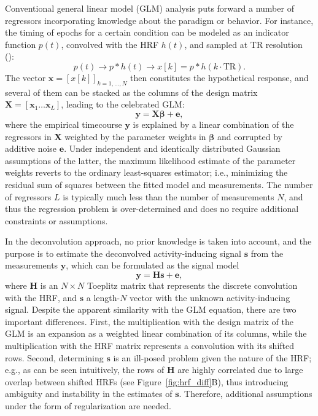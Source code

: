 Conventional general linear model (GLM) analysis puts forward a number of regressors incorporating knowledge about the paradigm or behavior. For instance, the timing of epochs for a certain condition can be modeled as an indicator function $p(t)$, convolved with the HRF $h(t)$, and sampled at TR resolution (\citealt{friston1994analysis, friston1998event, boynton1996linear, cohen1997parametric}):
$$
   p(t) \rightarrow p*h(t) \rightarrow x[k] = p*h(k\cdot\text{TR}).
$$
The vector $\mathbf{x}=[x[k]]_{k=1,\ldots,N}$ then constitutes the hypothetical response, and several of them can be stacked as the columns of the design matrix $\mathbf{X}=[\mathbf{x}_1 \ldots \mathbf{x}_L]$, leading to the celebrated GLM: 
\begin{equation}
    \label{eq:glm}
    \mathbf{y} = \mathbf{X} \boldsymbol\beta + \mathbf{e},
\end{equation}
where the empirical timecourse $\mathbf{y}$ is explained by a linear combination of the regressors in $\mathbf{X}$ weighted by the parameter weights in $\boldsymbol\beta$ and corrupted by additive noise $\mathbf{e}$. Under independent and identically distributed Gaussian assumptions of the latter, the maximum likelihood estimate of the parameter weights reverts to the ordinary least-squares estimator; i.e., minimizing the residual sum of squares between the fitted model and measurements. The number of regressors $L$ is typically much less than the number of measurements $N$, and thus the regression problem is over-determined and does no require additional constraints or assumptions.

In the deconvolution approach, no prior knowledge is taken into account, and the purpose is to estimate the deconvolved activity-inducing signal $\mathbf{s}$ from the measurements $\mathbf{y}$, which can be formulated as the signal model
\begin{equation}
    \label{eq:deconvolution}
    \mathbf{y} = \mathbf{Hs} + \mathbf{e},
\end{equation}
where $\mathbf{H}$ is an $N\times N$ Toeplitz matrix that represents the discrete convolution with the HRF, and $\mathbf{s}$ a length-$N$ vector with the unknown activity-inducing signal. Despite the apparent similarity with the GLM equation, there are two important differences. First, the multiplication with the design matrix of the GLM is an expansion as a weighted linear combination of its columns, while the multiplication with the HRF matrix represents a convolution with its shifted rows. Second, determining $\mathbf{s}$ is an ill-posed problem given the nature of the HRF; e.g., as can be seen intuitively, the rows of $\mathbf{H}$ are highly correlated due to large overlap between shifted HRFs (see Figure~\ref{fig:hrf_diff}B), thus introducing ambiguity and instability in the estimates of $\mathbf{s}$. Therefore, additional assumptions under the form of regularization are needed. 

